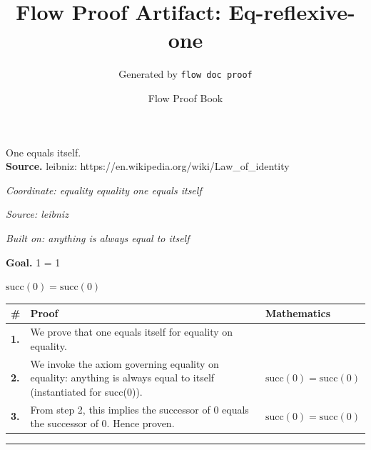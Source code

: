\documentclass[11pt]{article}
\title{Flow Proof Artifact: Eq-reflexive-one}
\author{Generated by \texttt{flow doc proof}}
\date{Flow Proof Book}
\theoremstyle{definition}
\begin{document}
\maketitle
One equals itself.\\[0.5em]
\textbf{Source.} leibniz: https://en.wikipedia.org/wiki/Law\_of\_identity\\[0.5em]
\bigskip
{}\par
\smallskip\noindent\textit{Coordinate: equality \cdot equality \cdot one equals itself}\par
\smallskip\noindent\textit{Source: leibniz}\par
\smallskip\noindent\textit{Built on: anything is always equal to itself}\par
\medskip
\noindent\textbf{Goal.} 1 = 1\par
\noindent$\displaystyle \mathrm{succ}(0) = \mathrm{succ}(0)$\par
\medskip
\noindent
\begin{tabular}{@{} >{\raggedright\arraybackslash}p{} >{\raggedright\arraybackslash}p{} >{\raggedleft\arraybackslash}p{} @{}}
\textbf{\#} & \textbf{Proof} & \textbf{Mathematics} \\
\midrule
\textbf{1.} & We prove that one equals itself for equality on equality. & \\[0.45em]
\textbf{2.} & We invoke the axiom governing equality on equality: anything is always equal to itself (instantiated for succ(0)). & $\displaystyle \mathrm{succ}(0) = \mathrm{succ}(0)$ \\[0.45em]
\textbf{3.} & From step 2, this implies the successor of 0 equals the successor of 0. Hence proven. & $\displaystyle \mathrm{succ}(0) = \mathrm{succ}(0)$ \\[0.45em]
\bottomrule
\end{tabular}
\label{thm:Eq-equality-one_equals_itself}
\par\medskip\hrule
\end{document}
